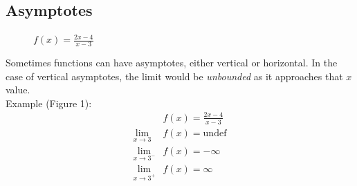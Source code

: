 \documentclass[12pt]{article}
\begin{document}
            \subsection{Asymptotes}
            \begin{figure}
                \begin{center}
                \end{center}
                \caption{$f(x) = \frac{2x-4}{x-3}$}
            \end{figure}

            Sometimes functions can have asymptotes, either vertical or horizontal. In the case of vertical asymptotes, the limit would be \textit{unbounded} as it approaches that $x$ value.
            \\ Example (Figure 1):
            \begin{align*}
                &f(x) = \frac{2x-4}{x-3} \\
                \lim_{x \to 3} &f(x) = \text{undef} \\
                \lim_{x \to 3^-} &f(x) = -\infty \\
                \lim_{x \to 3^+} &f(x) = \infty
            \end{align*}
\end{document}
